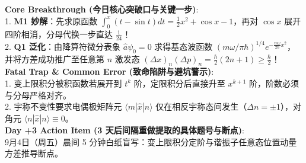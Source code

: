 \documentclass[a4paper,11pt]{article}
\begin{document}
\begin{tcolorbox}[
  enhanced, colback=white, colframe=border, boxrule=0.6pt, arc=2mm,
  left=4mm, right=4mm, top=3.5mm, bottom=3.5mm,
  fonttitle=\sffamily\bfseries\color{slate},
  title={\raisebox{0pt}{\color{forest}\rule{3pt}{10pt}}\hspace{4pt}Key Derivation Insights \& Traps \textbar\ 突破口与避坑沉淀},
  colbacktitle=paper, coltitle=slate,
  titlerule=0pt, toptitle=2mm, bottomtitle=2mm
]
\sffamily\small
\textbf{Core Breakthrough (今日核心突破口与关键一步)}:\\[3pt]
{\color{slate}
1. \textbf{M1 妙解}：先求原函数 $\int_0^x (t-\sin t)dt = \frac{1}{2}x^2+\cos x-1$，再对 $\cos x$ 展开四阶相消，分母代换一步直达 $\frac{1}{24}$！\\
2. \textbf{Q1 泛化}：由降算符微分表象 $\hat{a}\psi_0=0$ 求得基态波函数 $(m\omega/\pi\hbar)^{1/4}e^{-\frac{m\omega}{2\hbar}x^2}$，并将方差成功推广至任意第 $n$ 激发态 $(\Delta x)_n(\Delta p)_n = \frac{\hbar}{2}(2n+1) \ge \frac{\hbar}{2}$！
}\\[8pt]
\textbf{Fatal Trap \& Common Error (致命陷阱与避坑警示)}:\\[3pt]
{\color{wine}
1. 变上限积分被积函数若展开到 $t^k$ 阶，定限积分后直接升至 $x^{k+1}$ 阶，阶数必须与分母严格对齐。\\
2. 宇称不变性要求电偶极矩阵元 $\langle m|\hat{x}|n\rangle$ 仅在相反宇称态间发生（$\Delta n = \pm 1$），对角元 $\langle n|\hat{x}|n\rangle \equiv 0$。
}\\[8pt]
\textbf{Day +3 Action Item (3 天后间隔重做提取的具体题号与断点)}:\\[3pt]
{\color{royal}
9月4日（周五）晨间 5 分钟白纸盲写：变上限积分定阶与谐振子任意态位置动量方差推导断点。
}
\end{tcolorbox}
\end{document}
